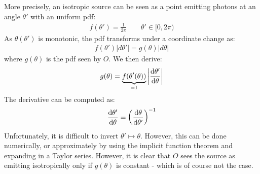 \documentclass[../template.tex]{subfiles}
\begin{document}
More precisely, an isotropic source can be seen as a point emitting photons at an angle $\theta'$ with an uniform pdf:
\begin{align*}
    f(\theta') = \frac{1}{2\pi} \qquad \theta' \in [0, 2\pi) 
\end{align*} 
As $\theta(\theta')$ is monotonic, the pdf transforms under a coordinate change as:
\begin{align*}
    f(\theta') |d \theta'| = g(\theta) |d \theta|
\end{align*} 
where $g(\theta)$ is the pdf seen by $O$. We then derive:
\begin{align*}
    g(\theta) = \underbrace{f(\theta'(\theta))}_{=1}  \left|\dv{\theta'}{\theta} (\theta)\right|
\end{align*} 
The derivative can be computed as:
\begin{align*}
    \dv{\theta'}{\theta} = \left(\dv{\theta}{\theta'} (\theta(\theta')) \right)^{-1}
\end{align*}
Unfortunately, it is difficult to invert $\theta' \mapsto \theta$. However, this can be done numerically, or approximately by using the implicit function theorem and expanding in a Taylor series. However, it is clear that $O$ sees the source as emitting isotropically only if $g(\theta)$ is constant - which is of course not the case.  
\end{document}
